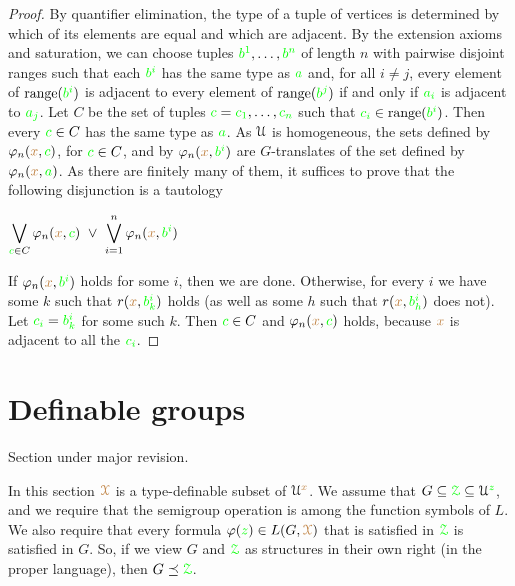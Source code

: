 \begin{proof}
  By quantifier elimination, the type of a tuple of vertices is determined by which of its elements are equal and which are adjacent.
  By the extension axioms and saturation, we can choose tuples ${\color{green} b^1},\ldots,{\color{green} b^n}$ of length $n$ with pairwise disjoint ranges such that each ${\color{green} b^i}$ has the same type as ${\color{green} a}$ and, for all $i\neq j$, every element of ${\rm range}({\color{green} b^i})$ is adjacent to every element of ${\rm range}({\color{green} b^j})$ if and only if ${\color{green} a_i}$ is adjacent to ${\color{green} a_j}$.
  Let $C$ be the set of tuples ${\color{green} c}={\color{green} c_1},\ldots,{\color{green} c_n}$ such that ${\color{green} c_i}\in{\rm range}({\color{green} b^i})$.
  Then every ${\color{green} c}\in C$ has the same type as ${\color{green} a}$.
  As $\EuScript U$ is homogeneous, the sets defined by $\varphi_n({\color{brown} x},{\color{green} c})$, for ${\color{green} c}\in C$, and by $\varphi_n({\color{brown} x},{\color{green} b^i})$ are $G$-translates of the set defined by $\varphi_n({\color{brown} x},{\color{green} a})$.
  As there are finitely many of them, it suffices to prove that the following disjunction is a tautology

  \hfil$\displaystyle\bigvee_{{\color{green} c}\in C}\varphi_n({\color{brown} x},{\color{green} c})\ \vee\ \bigvee_{i=1}^n \varphi_n({\color{brown} x},{\color{green} b^i})$

  If $\varphi_n({\color{brown} x},{\color{green} b^i})$ holds for some $i$, then we are done.
  Otherwise, for every $i$ we have some $k$ such that $r({\color{brown} x},{\color{green} b^i_k})$ holds (as well as some $h$ such that $r({\color{brown} x},{\color{green} b^i_h})$ does not).
  Let ${\color{green} c_i}={\color{green} b^i_k}$ for some such $k$.
  Then ${\color{green} c}\in C$ and $\varphi_n({\color{brown} x},{\color{green} c})$ holds, because ${\color{brown} x}$ is adjacent to all the ${\color{green} c_i}$.
\end{proof}

\section{Definable groups}\label{definablegroups}

\def\medrel#1{\parbox[t]{5ex}{$\displaystyle\hfil #1$}}
\def\ceq#1#2#3{\parbox[t]{16ex}{$\displaystyle #1$}\medrel{#2}{$\displaystyle #3$}}

\noindent\llap{\textcolor{red}{\Large\warning}\kern1.5ex}\ignorespaces
Section under major revision.

In this section ${\color{brown}\EuScript X}$ is a type-definable subset of $\EuScript U^{\color{brown} x}$.
We assume that $G\subseteq{\color{green}\EuScript Z}\subseteq\EuScript U^{\color{green} z}$, and we require that the semigroup operation is among the function symbols of $L$.
We also require that every formula $\varphi({\color{green} z})\in L(G,{\color{brown}\EuScript X})$ that is satisfied in ${\color{green}\EuScript Z}$ is satisfied in $G$.
So, if we view $G$ and ${\color{green}\EuScript Z}$ as structures in their own right (in the proper language), then $G\preceq{\color{green}\EuScript Z}$.

